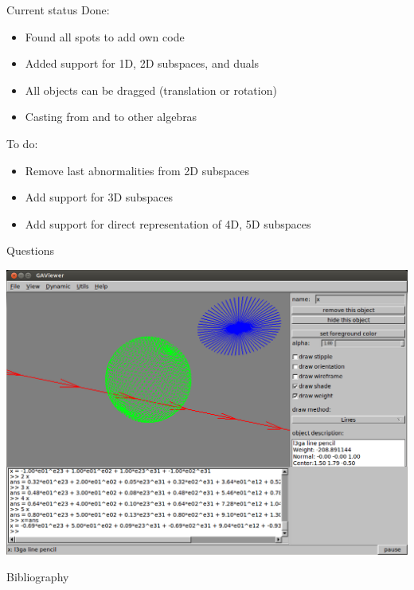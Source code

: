 \documentclass{beamer}
\begin{document}
\begin{frame}{Current status}
  Done:
  \begin{itemize}
    \item Found all spots to add own code
    \item Added support for 1D, 2D subspaces, and duals
    \item All objects can be dragged (translation or rotation)
    \item Casting from and to other algebras
  \end{itemize}

  To do:
  \begin{itemize}
    \item Remove last abnormalities from 2D subspaces
    \item Add support for 3D subspaces
    \item Add support for direct representation of 4D, 5D subspaces
  \end{itemize}
\end{frame}

\begin{frame}{Questions}
  \begin{center}
    \includegraphics[width=1\textwidth]{gaviewer2}
  \end{center}
\end{frame}

\begin{frame}{Bibliography}
  
  
\end{frame}
\end{document}
